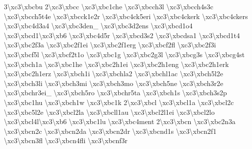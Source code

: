 \begin{DoxyCompactItemize}
3\textbackslash{}xc3\textbackslash{}xbcbu 2\textbackslash{}xc3\textbackslash{}xbcc \textbackslash{}xc3\textbackslash{}xbc1che \textbackslash{}xc3\textbackslash{}xbcch3l \textbackslash{}xc3\textbackslash{}xbcch4s3c \textbackslash{}xc3\textbackslash{}xbcch5t4e \textbackslash{}xc3\textbackslash{}xbcck1e2r \textbackslash{}xc3\textbackslash{}xbc4ck5eri \textbackslash{}xc3\textbackslash{}xbc4ckerk \textbackslash{}xc3\textbackslash{}xbc4ckers \textbackslash{}xc3\textbackslash{}xbc4d3a4 \textbackslash{}xc3\textbackslash{}xbc3den\-\_\- \textbackslash{}xc3\textbackslash{}xbc3d2ens \textbackslash{}xc3\textbackslash{}xbcd1o4 \textbackslash{}xc3\textbackslash{}xbcd1\textbackslash{}xc3\textbackslash{}xb6 \textbackslash{}xc3\textbackslash{}xbc4d5r \textbackslash{}xc3\textbackslash{}xbcd3s2 \textbackslash{}xc3\textbackslash{}xbcdsa1 \textbackslash{}xc3\textbackslash{}xbcd1t4 \textbackslash{}xc3\textbackslash{}xbc2f3a \textbackslash{}xc3\textbackslash{}xbc2f1ei \textbackslash{}xc3\textbackslash{}xbc2f1erg \textbackslash{}xc3\textbackslash{}xbcf2fl \textbackslash{}xc3\textbackslash{}xbc2f3i \textbackslash{}xc3\textbackslash{}xbcf5l \textbackslash{}xc3\textbackslash{}xbcf2t1o \textbackslash{}xc3\textbackslash{}xbc1g \textbackslash{}xc3\textbackslash{}xbc2g3l \textbackslash{}xc3\textbackslash{}xbcg3s \textbackslash{}xc3\textbackslash{}xbcg4st \textbackslash{}xc3\textbackslash{}xbch1a \textbackslash{}xc3\textbackslash{}xbc1he \textbackslash{}xc3\textbackslash{}xbc2h1ei \textbackslash{}xc3\textbackslash{}xbc2h1eng \textbackslash{}xc3\textbackslash{}xbc2h1erk \textbackslash{}xc3\textbackslash{}xbc2h1erz \textbackslash{}xc3\textbackslash{}xbch1i \textbackslash{}xc3\textbackslash{}xbchla2 \textbackslash{}xc3\textbackslash{}xbchl1ac \textbackslash{}xc3\textbackslash{}xbch5l2e \textbackslash{}xc3\textbackslash{}xbch3li \textbackslash{}xc3\textbackslash{}xbch3mi \textbackslash{}xc3\textbackslash{}xbch3mo \textbackslash{}xc3\textbackslash{}xbch5ne \textbackslash{}xc3\textbackslash{}xbch3r2e \textbackslash{}xc3\textbackslash{}xbchr3ei\-\_\- \textbackslash{}xc3\textbackslash{}xbch5ro \textbackslash{}xc3\textbackslash{}xbchr5ta \textbackslash{}xc3\textbackslash{}xbch1s \textbackslash{}xc3\textbackslash{}xbch3s2p \textbackslash{}xc3\textbackslash{}xbc1hu \textbackslash{}xc3\textbackslash{}xbch1w \textbackslash{}xc3\textbackslash{}xbc1k 2\textbackslash{}xc3\textbackslash{}xbcl \textbackslash{}xc3\textbackslash{}xbcl1a \textbackslash{}xc3\textbackslash{}xbcl2c \textbackslash{}xc3\textbackslash{}xbc5l2e \textbackslash{}xc3\textbackslash{}xbcl2la \textbackslash{}xc3\textbackslash{}xbcll1au \textbackslash{}xc3\textbackslash{}xbcl2l1ei \textbackslash{}xc3\textbackslash{}xbcl2lo \textbackslash{}xc3\textbackslash{}xbcl4l\textbackslash{}xc3\textbackslash{}xb6 \textbackslash{}xc3\textbackslash{}xbc1lu \textbackslash{}xc3\textbackslash{}xbc4ment 2\textbackslash{}xc3\textbackslash{}xbcn \textbackslash{}xc3\textbackslash{}xbc2n3a \textbackslash{}xc3\textbackslash{}xbcn2c \textbackslash{}xc3\textbackslash{}xbcn2da \textbackslash{}xc3\textbackslash{}xbcn2dr \textbackslash{}xc3\textbackslash{}xbcnd1s \textbackslash{}xc3\textbackslash{}xbcn2f1 \textbackslash{}xc3\textbackslash{}xbcn3fl \textbackslash{}xc3\textbackslash{}xbcn4fli \textbackslash{}xc3\textbackslash{}xbcnf3r 
\end{DoxyCompactItemize}
